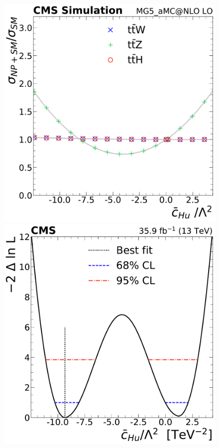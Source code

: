 \begin{landscape}
\begin{figure}
{        \includegraphics[height=\textheight]{figures/thirteen-TeV/NP/mu/cHu}\hspace{1cm}
        \includegraphics[height=\textheight]{figures/thirteen-TeV/NP/nll/cHu}\hspace{1cm}
}
\end{figure}
\end{landscape}
